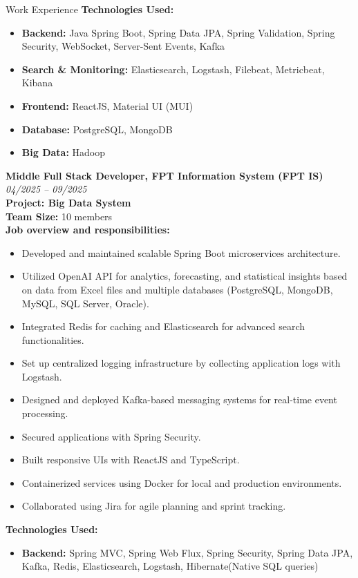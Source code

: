 \documentclass{resume} %
\begin{document}
\begin{rSection}{Work Experience}
\textbf{Technologies Used:}
\begin{itemize}
    \item \textbf{Backend:} Java Spring Boot, Spring Data JPA, Spring Validation, Spring Security, WebSocket, Server-Sent Events, Kafka
    \item \textbf{Search \& Monitoring:} Elasticsearch, Logstash, Filebeat, Metricbeat, Kibana
    \item \textbf{Frontend:} ReactJS, Material UI (MUI)
    \item \textbf{Database:} PostgreSQL, MongoDB
    \item \textbf{Big Data:} Hadoop
\end{itemize}
{\bf Middle Full Stack Developer, FPT Information System (FPT IS)} \hfill {\em 04/2025 – 09/2025}
\\ \textbf{Project: Big Data System}
\\ \textbf{Team Size:} 10 members
\\ \textbf{Job overview and responsibilities:}
\begin{itemize}
    \item Developed and maintained scalable Spring Boot microservices architecture.
    \item Utilized OpenAI API for analytics, forecasting, and statistical insights based on data from Excel files and multiple databases (PostgreSQL, MongoDB, MySQL, SQL Server, Oracle).
    \item Integrated Redis for caching and Elasticsearch for advanced search functionalities.
    \item Set up centralized logging infrastructure by collecting application logs with Logstash.
    \item Designed and deployed Kafka-based messaging systems for real-time event processing.
    \item Secured applications with Spring Security.
    \item Built responsive UIs with ReactJS and TypeScript.
    \item Containerized services using Docker for local and production environments.
    \item Collaborated using Jira for agile planning and sprint tracking.
\end{itemize}
\textbf{Technologies Used:}
\begin{itemize}
    \item \textbf{Backend:} Spring MVC, Spring Web Flux, Spring Security, Spring Data JPA, Kafka, Redis, Elasticsearch, Logstash, Hibernate(Native SQL queries)

\end{itemize}
\end{rSection}
\end{document}
